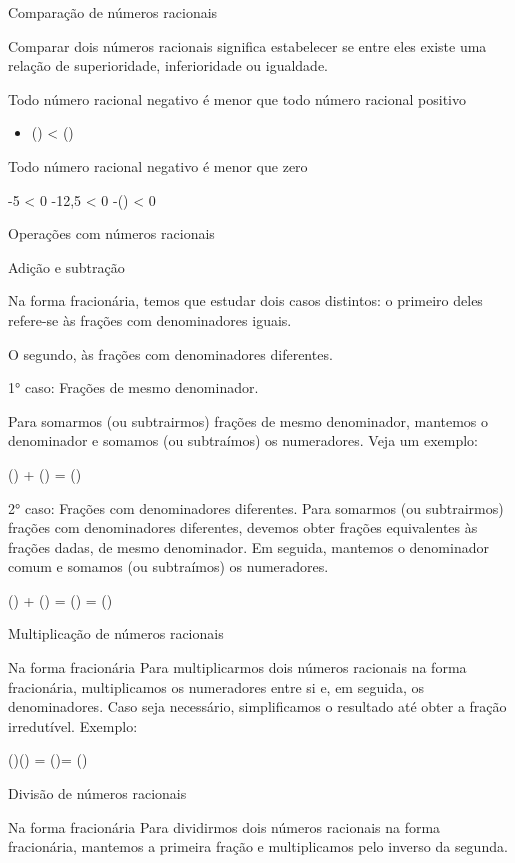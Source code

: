 Comparação de números racionais

Comparar dois números racionais significa estabelecer se entre eles
existe uma relação de superioridade, inferioridade ou igualdade.


Todo número racional negativo é menor que todo número racional positivo

\begin{itemize}
\tightlist

\item 
  () \textless{} ()
\end{itemize}

Todo número racional negativo é menor que zero

-5 \textless{} 0 -12,5 \textless{} 0 -() \textless{} 0

Operações com números racionais

Adição e subtração

Na forma fracionária, temos que estudar dois casos distintos: o primeiro
deles refere-se às frações com denominadores iguais.

O segundo, às frações com denominadores diferentes.

1° caso: Frações de mesmo denominador. 

Para somarmos (ou subtrairmos)
frações de mesmo denominador, mantemos o denominador e somamos (ou
subtraímos) os numeradores. Veja um exemplo:

() + () = ()

2° caso: Frações com denominadores diferentes. Para somarmos (ou
subtrairmos) frações com denominadores diferentes, devemos obter frações
equivalentes às frações dadas, de mesmo denominador. Em seguida,
mantemos o denominador comum e somamos (ou subtraímos) os numeradores.

() + () = () =
()

Multiplicação de números racionais

Na forma fracionária Para multiplicarmos dois números racionais na forma
fracionária, multiplicamos os numeradores entre si e, em seguida, os
denominadores. Caso seja necessário, simplificamos o resultado até obter
a fração irredutível. Exemplo:

()\times () = ()= ()

Divisão de números racionais

Na forma fracionária Para dividirmos dois números racionais na forma
fracionária, mantemos a primeira fração e multiplicamos pelo inverso da
segunda.


